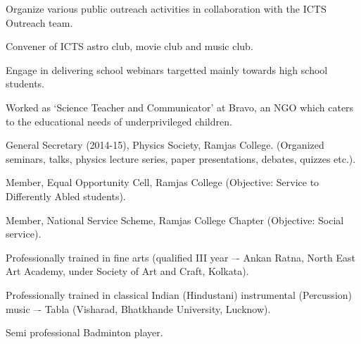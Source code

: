 \begin{itemize}[noitemsep]
{
\item Organize various public outreach activities in collaboration with the ICTS Outreach team.
\item Convener of ICTS astro club, movie club and music club.
\item Engage in delivering school webinars targetted mainly towards high school students.
\item Worked as `Science Teacher and Communicator' at Bravo, an NGO which caters to the educational needs of underprivileged children.
\item General Secretary (2014-15), Physics Society, Ramjas College. (Organized seminars, talks, physics lecture series, paper presentations, debates, quizzes etc.).
\item Member, Equal Opportunity Cell, Ramjas College (Objective: Service to Differently Abled students).
\item Member, National Service Scheme, Ramjas College Chapter (Objective: Social service).
\item Professionally trained in fine arts (qualified III year –- Ankan Ratna, North East Art Academy, under Society of Art and Craft, Kolkata).
\item Professionally trained in classical Indian (Hindustani) instrumental (Percussion) music –- Tabla (Visharad, Bhatkhande University, Lucknow).
\item Semi professional Badminton player.
}
\end{itemize}